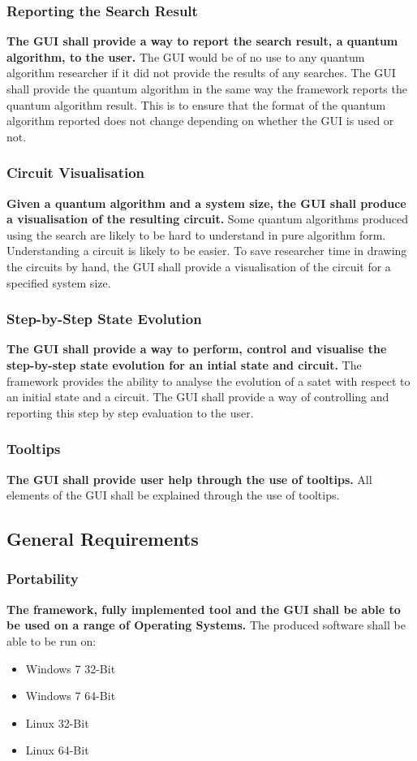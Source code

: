 \documentclass[authoryearcitations]{UoYCSproject}
\begin{document}
\subsubsection{Reporting the Search Result}
\textbf{The GUI shall provide a way to report the search result, a quantum algorithm, to the user.}
The GUI would be of no use to any quantum algorithm researcher if it did not provide the results of any searches.
The GUI shall provide the quantum algorithm in the same way the framework reports the quantum algorithm result.
This is to ensure that the format of the quantum algorithm reported does not change depending on whether the GUI is used or not.

\subsubsection{Circuit Visualisation}
\textbf{Given a quantum algorithm and a system size, the GUI shall produce a visualisation of the resulting circuit.}
Some quantum algorithms produced using the search are likely to be hard to understand in pure algorithm form.
Understanding a circuit is likely to be easier.
To save researcher time in drawing the circuits by hand, the GUI shall provide a visualisation of the circuit for a specified system size.

\subsubsection{Step-by-Step State Evolution}
\textbf{The GUI shall provide a way to perform, control and visualise the step-by-step state evolution for an intial state and circuit.}
The framework provides the ability to analyse the evolution of a satet with respect to an initial state and a circuit.
The GUI shall provide a way of controlling and reporting this step by step evaluation to the user.

\subsubsection{Tooltips}
\textbf{The GUI shall provide user help through the use of tooltips.}
All elements of the GUI shall be explained through the use of tooltips.

\subsection{General Requirements}
\subsubsection{Portability}
\textbf{The framework, fully implemented tool and the GUI shall be able to be used on a range of Operating Systems.}
The produced software shall be able to be run on:
\begin{itemize}
 \item Windows 7 32-Bit
 \item Windows 7 64-Bit
 \item Linux 32-Bit
 \item Linux 64-Bit
\end{itemize}
\end{document}
